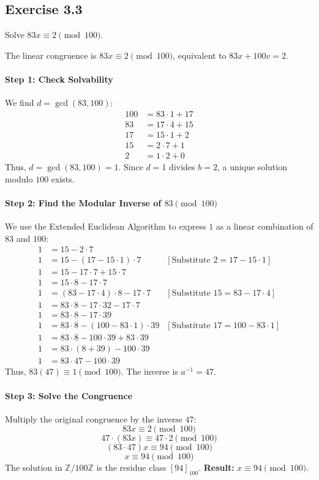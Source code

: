 \subsection*{Exercise 3.3}
Solve $83x \equiv 2 \pmod{100}$.

\begin{solution}
The linear congruence is $83x \equiv 2 \pmod{100}$, equivalent to $83x + 100v = 2$.

\paragraph{Step 1: Check Solvability}
We find $d = \gcd(83, 100)$:
\begin{align*}
    100 &= 83 \cdot 1 + 17 \\
    83 &= 17 \cdot 4 + 15 \\
    17 &= 15 \cdot 1 + 2 \\
    15 &= 2 \cdot 7 + 1 \\
    2 &= 1 \cdot 2 + 0
\end{align*}
Thus, $d = \gcd(83, 100) = 1$. Since $d=1$ divides $b=2$, a unique solution modulo $100$ exists.

\paragraph{Step 2: Find the Modular Inverse of $83 \pmod{100}$}
We use the Extended Euclidean Algorithm to express $1$ as a linear combination of $83$ and $100$:
\begin{align*}
    1 &= 15 - 2 \cdot 7 \\
    1 &= 15 - (17 - 15 \cdot 1) \cdot 7 & [\text{Substitute } 2 = 17 - 15 \cdot 1] \\
    1 &= 15 - 17 \cdot 7 + 15 \cdot 7 \\
    1 &= 15 \cdot 8 - 17 \cdot 7 \\
    1 &= (83 - 17 \cdot 4) \cdot 8 - 17 \cdot 7 & [\text{Substitute } 15 = 83 - 17 \cdot 4] \\
    1 &= 83 \cdot 8 - 17 \cdot 32 - 17 \cdot 7 \\
    1 &= 83 \cdot 8 - 17 \cdot 39 \\
    1 &= 83 \cdot 8 - (100 - 83 \cdot 1) \cdot 39 & [\text{Substitute } 17 = 100 - 83 \cdot 1] \\
    1 &= 83 \cdot 8 - 100 \cdot 39 + 83 \cdot 39 \\
    1 &= 83 \cdot (8 + 39) - 100 \cdot 39 \\
    1 &= 83 \cdot 47 - 100 \cdot 39
\end{align*}
Thus, $83(47) \equiv 1 \pmod{100}$. The inverse is $a^{-1} = 47$.

\paragraph{Step 3: Solve the Congruence}
Multiply the original congruence by the inverse $47$:
$$ 83x \equiv 2 \pmod{100} $$
$$ 47 \cdot (83x) \equiv 47 \cdot 2 \pmod{100} $$
$$ (83 \cdot 47) x \equiv 94 \pmod{100} $$
$$ x \equiv 94 \pmod{100} $$
The solution in $\mathbb{Z}/100\mathbb{Z}$ is the residue class $[94]_{100}$.
\textbf{Result:} $x \equiv 94 \pmod{100}$.
\end{solution}

